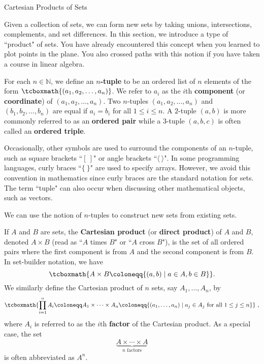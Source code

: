 \begin{section}{Cartesian Products of Sets}\label{sec:Cartesian_Products}

Given a collection of sets, we can form new sets by taking unions, intersections, complements, and set differences.  In this section, we introduce a type of ``product" of sets.  You have already encountered this concept when you learned to plot points in the plane.  You also crossed paths with this notion if you have taken a course in linear algebra.

\begin{definition}
For each $n\in \mathbb{N}$, we define an \textbf{$n$-tuple} to be an ordered list of $n$ elements of the form $\tcboxmath{(a_1, a_2,\ldots,a_n)}$. We refer to $a_i$ as the $i$th \textbf{component} (or \textbf{coordinate}) of $(a_1, a_2,\ldots,a_n)$. Two $n$-tuples $(a_1, a_2,\ldots,a_n)$ and $(b_1, b_2,\ldots,b_n)$ are equal if $a_i=b_i$ for all $1\leq i\leq n$. A $2$-tuple $(a,b)$ is more commonly referred to as an \textbf{ordered pair} while a $3$-tuple $(a,b,c)$ is often called an \textbf{ordered triple}.
\end{definition}

Occasionally, other symbols are used to surround the components of an $n$-tuple, such as square brackets ``$[\ ]$" or angle brackets ``$\langle\ \rangle$". In some programming languages, curly braces ``$\{\ \}$" are used to specify arrays. However, we avoid this convention in mathematics since curly braces are the standard notation for sets. The term ``tuple" can also occur when discussing other mathematical objects, such as vectors.

We can use the notion of $n$-tuples to construct new sets from existing sets.

\begin{definition}
If $A$ and $B$ are sets, the \textbf{Cartesian product} (or \textbf{direct product}) of $A$ and $B$, denoted $A\times B$ (read as ``$A$ times $B$" or ``$A$ cross $B$"), is the set of all ordered pairs where the first component is from $A$ and the second component is from $B$. In set-builder notation, we have
\[
\tcboxmath{A\times B\coloneqq \{(a,b)\mid a\in A, b\in B\}}.
\]
We similarly define the Cartesian product of $n$ sets, say $A_1, \ldots, A_n$, by
\[
\tcboxmath{\prod_{i=1}^{n} A_i\coloneqq A_1\times \cdots \times A_n\coloneqq \{(a_1,\ldots,a_n)\mid  a_j\in A_j \mbox{ for all }1\leq j\leq n\}}\ ,
\]
where $A_i$ is referred to as the $i$th \textbf{factor} of the Cartesian product. As a special case, the set 
\[
\underbrace{A\times \cdots \times A}_{n\text{ factors}}
\]
is often abbreviated as $A^n$.
\end{definition}


\end{section}
